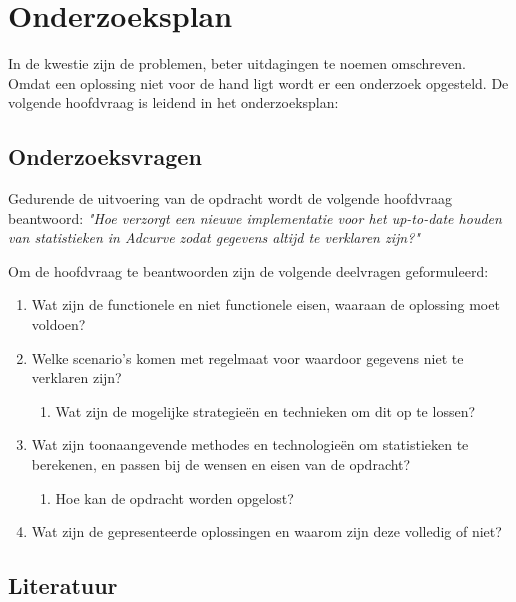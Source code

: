 \chapter{Onderzoeksplan}

In de kwestie zijn de problemen, beter uitdagingen te noemen omschreven. Omdat een oplossing niet voor de hand ligt wordt er een onderzoek opgesteld. De volgende hoofdvraag is leidend in het onderzoeksplan:

\section{Onderzoeksvragen}
Gedurende de uitvoering van de opdracht wordt de volgende hoofdvraag beantwoord: 
\textit{"Hoe verzorgt een nieuwe implementatie voor het up-to-date houden van statistieken in Adcurve zodat gegevens altijd te verklaren zijn?"}

\noindent Om de hoofdvraag te beantwoorden zijn de volgende deelvragen geformuleerd:
\begin{enumerate}[topsep=0pt]
\item Wat zijn de functionele en niet functionele eisen, waaraan de oplossing moet voldoen?
\item Welke scenario's komen met regelmaat voor waardoor gegevens niet te verklaren zijn?
\begin{enumerate}
    \item Wat zijn de mogelijke strategieën en technieken om dit op te lossen?
\end{enumerate}

\item Wat zijn toonaangevende methodes en technologieën om statistieken te berekenen, en passen bij de wensen en eisen van de opdracht?
\begin{enumerate}
    \item Hoe kan de opdracht worden opgelost?
\end{enumerate}

\item Wat zijn de gepresenteerde oplossingen en waarom zijn deze volledig of niet?
\end{enumerate}

\section{Literatuur} %

